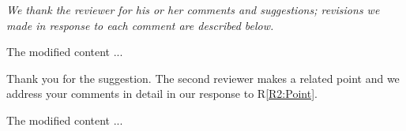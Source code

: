 \documentclass[12pt]{article}
\begin{document}
\textit{We thank the reviewer for his or her comments and suggestions;
revisions we made in response to each comment are described below.}

\begin{comment}
	\lipsum[2]
	\label{R2:Point}
\end{comment}

\begin{response}
	\lipsum[3]
\end{response}

\begin{recompose}
	The modified content ...
\end{recompose}  

\begin{comment}
	\lipsum[11]
\end{comment}

\begin{response}
Thank you for the suggestion. The second reviewer makes a related point and we address your comments in detail in our response to R\ref{R2:Point}.
\end{response}

\begin{recompose}
	The modified content ...
\end{recompose} 
\end{document}
